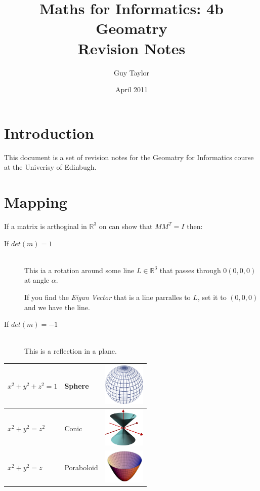 \documentclass[11pt,twoside,a4paper]{article}
\begin{document}
  
  \graphicspath{{img//}}
  
  \title{Maths for Informatics: 4b Geomatry \\Revision Notes}
  \author{Guy Taylor}
  \date{April 2011}
  
  \maketitle
  
  \tableofcontents
  
  \clearpage
  
  \section{Introduction}
    This document is a set of revision notes for the Geomatry for Informatics course at the Univerisy of Edinbugh.
  
  \clearpage
  \section{Mapping}
    If a matrix is arthoginal in \(\mathbb{R}^3\) on can show that \(MM^T = I\) then:
      \begin{description}
        \item[If \(det(m) = 1\)] \hfill \\
          This ia a rotation around some line \(L \in \mathbb{R}^3\) that passes through \(0 (0,0,0)\) at angle \(\alpha\).
          
          If you find the \textit{Eigan Vector} that is a line parralles to \(L\), set it to \((0,0,0)\) and we have the line.
        
        \item[If \(det(m) = -1\)] \hfill \\
          This is a reflection in a plane.
      \end{description}
    
    \begin{tabular}{l|l|l}
      \(x^2+y^2+z^2=1\) & Sphere      & \includegraphics[width=2cm]{Sphere_wireframe_10deg_6r} \\ \hline
      \(x^2+y^2=z^2\)   & Conic       & \includegraphics[width=2cm]{DoubleCone} \\ \hline
      \(x^2+y^2=z\)     & Poraboloid  & \includegraphics[width=2cm]{Paraboloid_of_Revolution}  \\
    \end{tabular}
    
\end{document}
